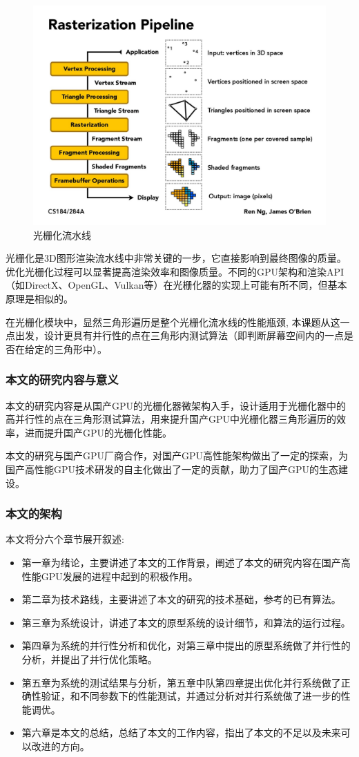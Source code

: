 \begin{figure}
    \centering

    \includegraphics[width = .5\textwidth]{figure/rasterization_pipeline.jpeg.jpg}
    \caption{光栅化流水线}
    \label{fig:rast pipeline}
\end{figure}
光栅化是3D图形渲染流水线中非常关键的一步，它直接影响到最终图像的质量。优化光栅化过程可以显著提高渲染效率和图像质量。不同的GPU架构和渲染API（如DirectX、OpenGL、Vulkan等）在光栅化器的实现上可能有所不同，但基本原理是相似的。

在光栅化模块中，显然三角形遍历是整个光栅化流水线的性能瓶颈, 本课题从这一点出发，设计更具有并行性的点在三角形内测试算法（即判断屏幕空间内的一点是否在给定的三角形中）。


\subsubsection{本文的研究内容与意义}
本文的研究内容是从国产GPU的光栅化器微架构入手，设计适用于光栅化器中的高并行性的点在三角形测试算法，用来提升国产GPU中光栅化器三角形遍历的效率，进而提升国产GPU的光栅化性能。

本文的研究与国产GPU厂商合作，对国产GPU高性能架构做出了一定的探索，为国产高性能GPU技术研发的自主化做出了一定的贡献，助力了国产GPU的生态建设。

\subsubsection{本文的架构}

本文将分六个章节展开叙述:

\begin{itemize}
    \item 第一章为绪论，主要讲述了本文的工作背景，阐述了本文的研究内容在国产高性能GPU发展的进程中起到的积极作用。
    \item 第二章为技术路线，主要讲述了本文的研究的技术基础，参考的已有算法。
    \item 第三章为系统设计，讲述了本文的原型系统的设计细节，和算法的运行过程。
    \item 第四章为系统的并行性分析和优化，对第三章中提出的原型系统做了并行性的分析，并提出了并行优化策略。
    \item 第五章为系统的测试结果与分析，第五章中队第四章提出优化并行系统做了正确性验证，和不同参数下的性能测试，并通过分析对并行系统做了进一步的性能调优。
    \item 第六章是本文的总结，总结了本文的工作内容，指出了本文的不足以及未来可以改进的方向。
\end{itemize}


